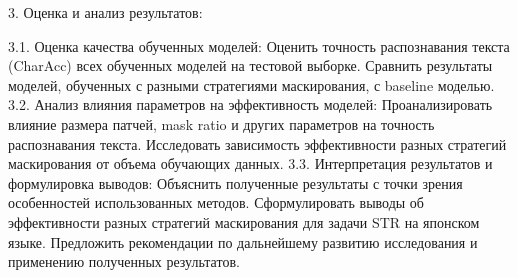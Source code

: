 3. Оценка и анализ результатов:

3.1. Оценка  качества  обученных  моделей:
     Оценить  точность  распознавания  текста  (CharAcc)  всех  обученных  моделей  на  тестовой  выборке. 
     Сравнить  результаты  моделей,  обученных  с  разными  стратегиями  маскирования,  с  baseline  моделью. 
3.2. Анализ  влияния  параметров  на  эффективность  моделей:
     Проанализировать  влияние  размера  патчей,  mask ratio  и  других  параметров  на  точность  распознавания  текста. 
     Исследовать  зависимость  эффективности  разных  стратегий  маскирования  от  объема  обучающих  данных.
3.3.  Интерпретация  результатов  и  формулировка  выводов:
     Объяснить  полученные  результаты  с  точки  зрения  особенностей  использованных  методов.
     Сформулировать  выводы  об  эффективности  разных  стратегий  маскирования  для  задачи  STR  на  японском  языке.
     Предложить  рекомендации  по  дальнейшему  развитию  исследования  и  применению  полученных  результатов. 

\newpage
